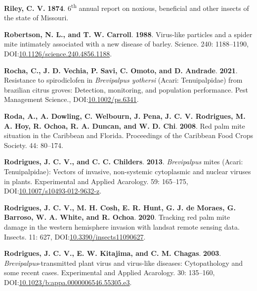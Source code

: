 \documentclass[12pt,final,CPage]{ufthesis}
\newlength{\cslhangindent}
\newenvironment{CSLReferences}[2] %
{%
	\setlength{\parindent}{0pt}
	\ifodd #1 \everypar{\setlength{\hangindent}{\cslhangindent}}\ignorespaces\fi
	\ifnum #2 > 0
	\setlength{\parskip}{#2\baselineskip}
	\fi
}%
{}
\begin{document}
{\begin{CSLReferences}{1}{0}
  \leavevmode{}%
  \textbf{Riley, C. V.} \textbf{1874}. 6\textsuperscript{th} annual report on noxious, beneficial and other insects of the state of {Missouri}.

  \leavevmode{}%
  \textbf{Robertson, N. L., and T. W. Carroll}. \textbf{1988}. Virus-like particles and a spider mite intimately associated with a new disease of barley. Science. 240: 1188--1190, DOI:\href{https://doi.org/10.1126/science.240.4856.1188}{10.1126/science.240.4856.1188}.

  \leavevmode{}%
  \textbf{Rocha, C., J. D. Vechia, P. Savi, C. Omoto, and D. Andrade}. \textbf{2021}. Resistance to spirodiclofen in {\emph{Brevipalpus yothersi}} ({Acari}: {Tenuipalpidae}) from brazilian citrus groves: Detection, monitoring, and population performance. Pest Management Science., DOI:\href{https://doi.org/10.1002/ps.6341}{10.1002/ps.6341}.

  \leavevmode{}%
  \textbf{Roda, A., A. Dowling, C. Welbourn, J. Pena, J. C. V. Rodrigues, M. A. Hoy, R. Ochoa, R. A. Duncan, and W. D. Chi}. \textbf{2008}. Red palm mite situation in the {Caribbean} and {Florida}. Proceedings of the Caribbean Food Crops Society. 44: 80--174.

  \leavevmode{}%
  \textbf{Rodrigues, J. C. V., and C. C. Childers}. \textbf{2013}. {\emph{Brevipalpus}} mites ({Acari}: {Tenuipalpidae}): Vectors of invasive, non-systemic cytoplasmic and nuclear viruses in plants. Experimental and Applied Acarology. 59: 165--175, DOI:\href{https://doi.org/10.1007/s10493-012-9632-z}{10.1007/s10493-012-9632-z}.

  \leavevmode{}%
  \textbf{Rodrigues, J. C. V., M. H. Cosh, E. R. Hunt, G. J. de Moraes, G. Barroso, W. A. White, and R. Ochoa}. \textbf{2020}. Tracking red palm mite damage in the western hemisphere invasion with landsat remote sensing data. Insects. 11: 627, DOI:\href{https://doi.org/10.3390/insects11090627}{10.3390/insects11090627}.

  \leavevmode{}%
  \textbf{Rodrigues, J. C. V., E. W. Kitajima, and C. M. Chagas}. \textbf{2003}. {\emph{Brevipalpus}}-transmitted plant virus and virus-like diseases: Cytopathology and some recent cases. Experimental and Applied Acarology. 30: 135--160, DOI:\href{https://doi.org/10.1023/b:appa.0000006546.55305.e3}{10.1023/b:appa.0000006546.55305.e3}.


\end{CSLReferences}}
\end{document}
